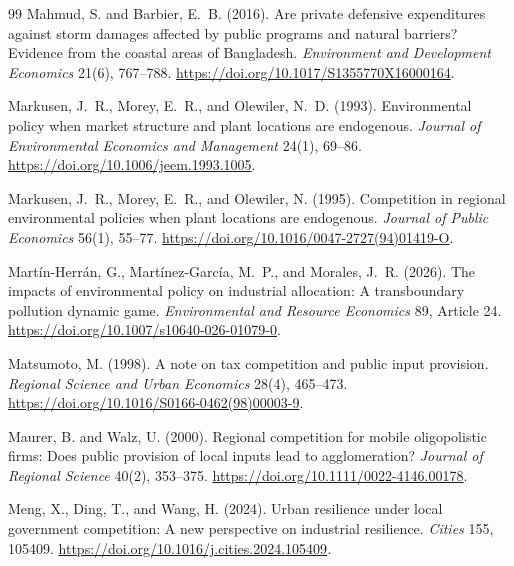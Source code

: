\begin{thebibliography}{99}
Mahmud, S. and Barbier, E.~B. (2016).
\newblock Are private defensive expenditures against storm damages affected by public programs and natural barriers? Evidence from the coastal areas of Bangladesh.
\newblock \emph{Environment and Development Economics} 21(6), 767--788. \url{https://doi.org/10.1017/S1355770X16000164}.

Markusen, J.~R., Morey, E.~R., and Olewiler, N.~D. (1993).
\newblock Environmental policy when market structure and plant locations are endogenous.
\newblock \emph{Journal of Environmental Economics and Management} 24(1), 69--86. \url{https://doi.org/10.1006/jeem.1993.1005}.

Markusen, J.~R., Morey, E.~R., and Olewiler, N. (1995).
\newblock Competition in regional environmental policies when plant locations are endogenous.
\newblock \emph{Journal of Public Economics} 56(1), 55--77. \url{https://doi.org/10.1016/0047-2727(94)01419-O}.

Mart\'in-Herr\'an, G., Mart\'inez-Garc\'ia, M.~P., and Morales, J.~R. (2026).
\newblock The impacts of environmental policy on industrial allocation: A transboundary pollution dynamic game.
\newblock \emph{Environmental and Resource Economics} 89, Article 24. \url{https://doi.org/10.1007/s10640-026-01079-0}.

Matsumoto, M. (1998).
\newblock A note on tax competition and public input provision.
\newblock \emph{Regional Science and Urban Economics} 28(4), 465--473. \url{https://doi.org/10.1016/S0166-0462(98)00003-9}.

Maurer, B. and Walz, U. (2000).
\newblock Regional competition for mobile oligopolistic firms: Does public provision of local inputs lead to agglomeration?
\newblock \emph{Journal of Regional Science} 40(2), 353--375. \url{https://doi.org/10.1111/0022-4146.00178}.

Meng, X., Ding, T., and Wang, H. (2024).
\newblock Urban resilience under local government competition: A new perspective on industrial resilience.
\newblock \emph{Cities} 155, 105409. \url{https://doi.org/10.1016/j.cities.2024.105409}.


\end{thebibliography}

